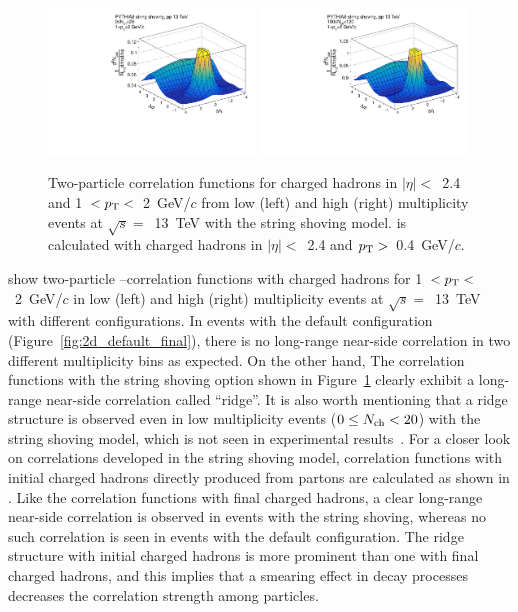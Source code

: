 \begin{figure}[tbh]
\includegraphics[width=0.49\textwidth]{figures/2D_shoving_lo_final.pdf}
\includegraphics[width=0.49\textwidth]{figures/2D_shoving_hi_final.pdf}
\caption{Two-particle correlation functions for charged hadrons in $|\eta|<$~2.4 and 1~$<\mbox{$p_{\mathrm{T}}$}<$~2~GeV/$c$ from low (left) and high (right) multiplicity \pythia \pp events at $\sqrt{s}=$~13~TeV with the string shoving model. \Nch is calculated with charged hadrons in $|\eta|<$~2.4 and $\mbox{$p_{\mathrm{T}}$}>$~0.4~GeV/$c$.}
\label{fig:2d_shoving_final}
\end{figure}

 show two-particle \deta--\dphi correlation functions with charged hadrons for 1~$<\mbox{$p_{\mathrm{T}}$}<$~2~GeV/$c$ in low (left) and high (right) multiplicity \pythia \pp events at $\sqrt{s}=$~13~TeV with different configurations. 
In \pythia events with the default configuration (Figure~\ref{fig:2d_default_final}), there is no long-range near-side correlation in two different multiplicity bins as expected. 
On the other hand, The correlation functions with the string shoving option shown in Figure~\ref{fig:2d_shoving_final} clearly exhibit a long-range near-side correlation called ``ridge''.
It is also worth mentioning that a ridge structure is observed even in low multiplicity events ($0\leq \mbox{$N_\mathrm{ch}$} <20$) with the string shoving model, which is not seen in experimental results~\cite{Khachatryan:2015lva}.
For a closer look on correlations developed in the string shoving model, correlation functions with initial charged hadrons directly produced from partons are calculated as shown in .
Like the correlation functions with final charged hadrons, a clear long-range near-side correlation is observed in events with the string shoving, whereas no such correlation is seen in events with the default configuration.
The ridge structure with initial charged hadrons is more prominent than one with final charged hadrons, and this implies that a smearing effect in decay processes decreases the correlation strength among particles. 

